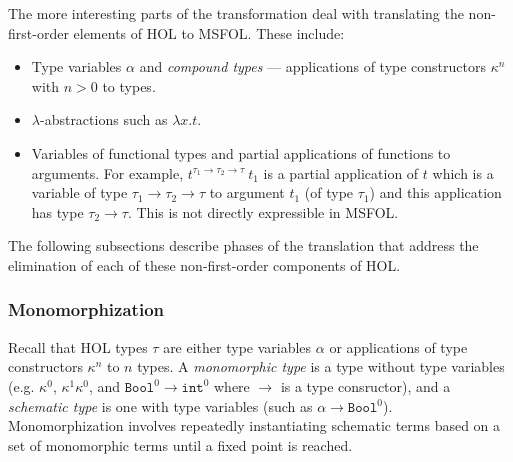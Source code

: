 \documentclass[11pt]{article}
\begin{document}
	The more interesting parts of the 
	transformation deal with 
	translating the non-first-order
	elements of HOL to MSFOL. These 
	include:
	\begin{itemize}
		\item Type variables $\alpha$
		and \textit{compound types} ---
		applications of type constructors
		$\kappa^n$ with $n > 0$ to 
		types.
		\item $\lambda$-abstractions 
		such as $\lambda x. t$.
		\item Variables of functional 
		types and partial applications 
		of functions to arguments. 
		For example, 
		$t^{\tau_1 \to \tau_2 \to 
			\tau}\ t_1$ is a 
		partial application of $t$ 
		which is a variable of type 
		$\tau_1 \to \tau_2 \to \tau$
		to argument $t_1$ (of type 
		$\tau_1$) and this 
		application has type 
		$\tau_2 \to \tau$.
		This is not directly 
		expressible in MSFOL.
	\end{itemize}
	The following subsections describe
	phases of the translation that 
	address the elimination of each of 
	these non-first-order components of 
	HOL.
	
	\subsubsection{Monomorphization}
	Recall that HOL types $\tau$ are 
	either type	variables $\alpha$ or 
	applications of type constructors 
	$\kappa^n$ to $n$ types.
	A \textit{monomorphic type} is a
	type without type variables 
	(e.g. $\kappa^0$, $\kappa^1 
	\kappa^0$, and $\texttt{Bool}^0 
	\to \texttt{int}^0$ 
	where $\to$ is 
	a type consructor), and 
	a \textit{schematic type} is one 
	with type variables (such as 
	$\alpha \to \texttt{Bool}^0$). 
	Monomorphization involves 
	repeatedly instantiating schematic
	terms based on a set of 
	monomorphic terms until a fixed 
	point is reached.
	
\end{document}
